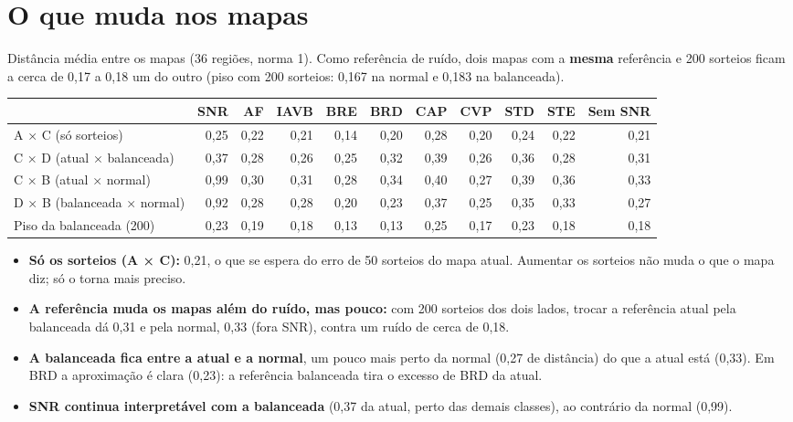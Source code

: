 \documentclass[11pt,a4paper]{article}
\begin{document}
\section{O que muda nos mapas}
Distância média entre os mapas (36 regiões, norma 1). Como referência de ruído, dois mapas com a \textbf{mesma} referência e 200 sorteios ficam a cerca de 0,17 a 0,18 um do outro (piso com 200 sorteios: 0,167 na normal e 0,183 na balanceada).
\begin{center}\small
\setlength{\tabcolsep}{4pt}
\begin{tabular}{lrrrrrrrrrr}
\toprule
& \textbf{SNR} & \textbf{AF} & \textbf{IAVB} & \textbf{BRE} & \textbf{BRD} & \textbf{CAP} & \textbf{CVP} & \textbf{STD} & \textbf{STE} & \textbf{Sem SNR} \\
\midrule
A × C (só sorteios) & 0,25 & 0,22 & 0,21 & 0,14 & 0,20 & 0,28 & 0,20 & 0,24 & 0,22 & 0,21 \\
C × D (atual × balanceada) & 0,37 & 0,28 & 0,26 & 0,25 & 0,32 & 0,39 & 0,26 & 0,36 & 0,28 & 0,31 \\
C × B (atual × normal) & 0,99 & 0,30 & 0,31 & 0,28 & 0,34 & 0,40 & 0,27 & 0,39 & 0,36 & 0,33 \\
D × B (balanceada × normal) & 0,92 & 0,28 & 0,28 & 0,20 & 0,23 & 0,37 & 0,25 & 0,35 & 0,33 & 0,27 \\ \addlinespace
Piso da balanceada (200) & 0,23 & 0,19 & 0,18 & 0,13 & 0,13 & 0,25 & 0,17 & 0,23 & 0,18 & 0,18 \\
\bottomrule
\end{tabular}
\end{center}
\begin{itemize}
\item \textbf{Só os sorteios (A × C):} 0,21, o que se espera do erro de 50 sorteios do mapa atual. Aumentar os sorteios não muda o que o mapa diz; só o torna mais preciso.
\item \textbf{A referência muda os mapas além do ruído, mas pouco:} com 200 sorteios dos dois lados, trocar a referência atual pela balanceada dá 0,31 e pela normal, 0,33 (fora SNR), contra um ruído de cerca de 0,18.
\item \textbf{A balanceada fica entre a atual e a normal}, um pouco mais perto da normal (0,27 de distância) do que a atual está (0,33). Em BRD a aproximação é clara (0,23): a referência balanceada tira o excesso de BRD da atual.
\item \textbf{SNR continua interpretável com a balanceada} (0,37 da atual, perto das demais classes), ao contrário da normal (0,99).
\end{itemize}
\end{document}
